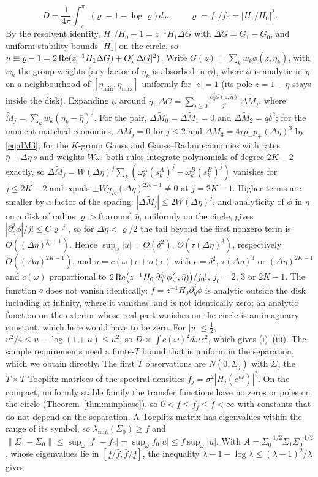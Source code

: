 \documentclass[12pt]{article}
\theoremstyle{definition}
\theoremstyle{remark}
\begin{document}
\[
D=\frac1{4\pi}\int_{-\pi}^{\pi}\bigl(\varrho-1-\log\varrho\bigr)\,d\omega,\qquad \varrho=f_1/f_0=|H_1/H_0|^2 .
\] By the resolvent identity, $H_1/H_0-1=z^{-1}H_1\Delta G$ with $\Delta G=G_1-G_0$, and uniform stability bounds $|H_1|$ on the circle, so $u\equiv\varrho-1=2\,{\rm Re}(z^{-1}H_1\Delta G)+O(|\Delta G|^2)$. Write $G(z)=\sum_kw_k\phi(z,\eta_k)$, with $w_k$ the group weights (any factor of $\eta_k$ is absorbed in $\phi$), where $\phi$ is analytic in $\eta$ on a neighbourhood of $[\eta_{\min},\eta_{\max}]$ uniformly for $|z|=1$ (its pole $z=1-\eta$ stays inside the disk). Expanding $\phi$ around $\bar\eta$, $\Delta G=\sum_{j\ge0}\frac{\partial_\eta^j\phi(z,\bar\eta)}{j!}\,\Delta\tilde M_j$, where $\tilde M_j=\sum_kw_k(\eta_k-\bar\eta)^j$. For the pair, $\Delta\tilde M_0=\Delta\tilde M_1=0$ and $\Delta\tilde M_2=q\delta^2$; for the moment-matched economies, $\Delta\tilde M_j=0$ for $j\le2$ and $\Delta\tilde M_3=4\tau p_-p_+(\Delta\eta)^3$ by \eqref{eq:dM3}; for the $K$-group Gauss and Gauss--Radau economies with rates $\bar\eta+\Delta\eta\,s$ and weights $W\omega$, both rules integrate polynomials of degree $2K-2$ exactly, so $\Delta\tilde M_j=W(\Delta\eta)^j\sum_k(\omega^A_k(s^A_k)^j-\omega^B_k(s^B_k)^j)$ vanishes for $j\le2K-2$ and equals $\pm Wg_K(\Delta\eta)^{2K-1}\neq0$ at $j=2K-1$. Higher terms are smaller by a factor of the spacing: $|\Delta\tilde M_j|\le2W(\Delta\eta)^j$, and analyticity of $\phi$ in $\eta$ on a disk of radius $\varrho>0$ around $\bar\eta$, uniformly on the circle, gives $|\partial_\eta^j\phi|/j!\le C\varrho^{-j}$, so for $\Delta\eta<\varrho/2$ the tail beyond the first nonzero term is $O((\Delta\eta)^{j_0+1})$. Hence $\sup_\omega|u|=O(\delta^2)$, $O(\tau(\Delta\eta)^3)$, respectively $O((\Delta\eta)^{2K-1})$, and $u=c(\omega)\epsilon+o(\epsilon)$ with $\epsilon=\delta^2$, $\tau(\Delta\eta)^3$ or $(\Delta\eta)^{2K-1}$ and $c(\omega)$ proportional to $2\,{\rm Re}\bigl(z^{-1}H_0\,\partial^{j_0}_\eta\phi(\cdot,\bar\eta)\bigr)/j_0!$, $j_0=2$, $3$ or $2K-1$. The function $c$ does not vanish identically: $f=z^{-1}H_0\partial^j_\eta\phi$ is analytic outside the disk including at infinity, where it vanishes, and is not identically zero; an analytic function on the exterior whose real part vanishes on the circle is an imaginary constant, which here would have to be zero. For $|u|\le\frac12$, $u^2/4\le u-\log(1+u)\le u^2$, so $D\asymp\int c(\omega)^2d\omega\,\epsilon^2$, which gives (i)--(iii). The sample requirements need a finite-$T$ bound that is uniform in the separation, which we obtain directly. The first $T$ observations are $N(0,\Sigma_j)$ with $\Sigma_j$ the $T\times T$ Toeplitz matrices of the spectral densities $f_j=\sigma^2|H_j(e^{i\omega})|^2$. On the compact, uniformly stable family the transfer functions have no zeros or poles on the circle (Theorem~\ref{thm:minphase}), so $0<\underline f\le f_j\le\bar f<\infty$ with constants that do not depend on the separation. A Toeplitz matrix has eigenvalues within the range of its symbol, so $\lambda_{\min}(\Sigma_0)\ge\underline f$ and $\|\Sigma_1-\Sigma_0\|\le\sup_\omega|f_1-f_0|=\sup_\omega f_0|u|\le\bar f\sup_\omega|u|$. With $A=\Sigma_0^{-1/2}\Sigma_1\Sigma_0^{-1/2}$, whose eigenvalues lie in $[\underline f/\bar f,\bar f/\underline f]$, the inequality $\lambda-1-\log\lambda\le(\lambda-1)^2/\lambda$ gives
\end{document}
